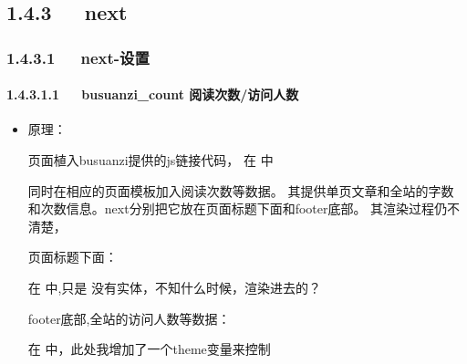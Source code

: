\documentclass[letterpaper,12pt,english]{sphinxmanual}
\begin{document}
\subsection{1.4.3   next}
\label{\detokenize{001software/001install/001._u7f51_u7ad9/hexo:next}}

\subsubsection{1.4.3.1   next-设置}
\label{\detokenize{001software/001install/001._u7f51_u7ad9/hexo:id4}}

\paragraph{1.4.3.1.1   busuanzi\_count 阅读次数/访问人数}
\label{\detokenize{001software/001install/001._u7f51_u7ad9/hexo:busuanzi-count}}\begin{itemize}
\item {} 
原理：

页面植入busuanzi提供的js链接代码，
在  中

\begin{sphinxVerbatim}[commandchars=\\\{\}]
    
\end{sphinxVerbatim}

同时在相应的页面模板加入阅读次数等数据。
其提供单页文章和全站的字数和次数信息。next分别把它放在页面标题下面和footer底部。
其渲染过程仍不清楚，

页面标题下面：

在  中,只是   没有实体，不知什么时候，渲染进去的？

footer底部,全站的访问人数等数据：

在   中，此处我增加了一个theme变量来控制

\begin{sphinxVerbatim}[commandchars=\\\{\}]
     
\end{sphinxVerbatim}

\end{itemize}
\end{document}
